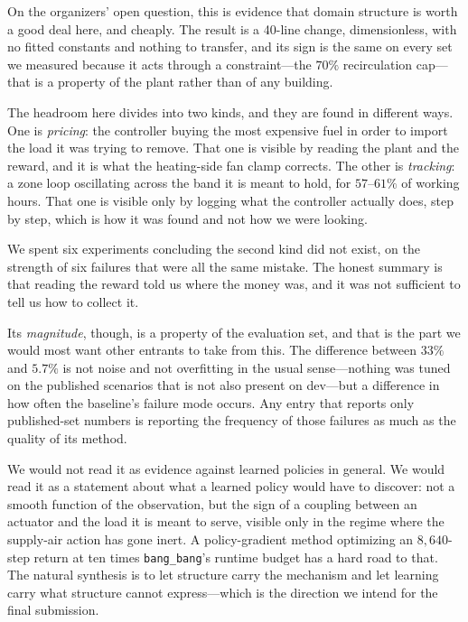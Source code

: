 \documentclass[10pt]{article}
\begin{document}
On the organizers' open question, this is evidence that domain structure is
worth a good deal here, and cheaply. The result is a 40-line change,
dimensionless, with no fitted constants and nothing to transfer, and its sign
is the same on every set we measured because it acts through a
constraint---the $70\%$ recirculation cap---that is a property of the plant
rather than of any building.

The headroom here divides into two kinds, and they are found in different
ways. One is \emph{pricing}: the controller buying the most expensive fuel in
order to import the load it was trying to remove. That one is visible by
reading the plant and the reward, and it is what the heating-side fan clamp
corrects. The other is \emph{tracking}: a zone loop oscillating across the band
it is meant to hold, for $57$--$61\%$ of working hours. That one is visible
only by logging what the controller actually does, step by step, which is how
it was found \cite{probezt} and not how we were looking.

We spent six experiments concluding the second kind did not exist, on the
strength of six failures that were all the same mistake. The honest summary is
that reading the reward told us where the money was, and it was not sufficient
to tell us how to collect it.

Its \emph{magnitude}, though, is a property of the evaluation set, and that is
the part we would most want other entrants to take from this. The difference
between $33\%$ and $5.7\%$ is not noise and not overfitting in the usual
sense---nothing was tuned on the published scenarios that is not also present
on dev---but a difference in how often the baseline's failure mode occurs. Any
entry that reports only published-set numbers is reporting the frequency of
those failures as much as the quality of its method.

We would not read it as evidence against learned policies in general. We would
read it as a statement about what a learned policy would have to discover: not a
smooth function of the observation, but the sign of a coupling between an
actuator and the load it is meant to serve, visible only in the regime where the
supply-air action has gone inert. A policy-gradient method optimizing an
$8{,}640$-step return at ten times \texttt{bang\_bang}'s runtime budget has a
hard road to that. The natural synthesis is to let structure carry the
mechanism and let learning carry what structure cannot express---which is the
direction we intend for the final submission.
\end{document}
